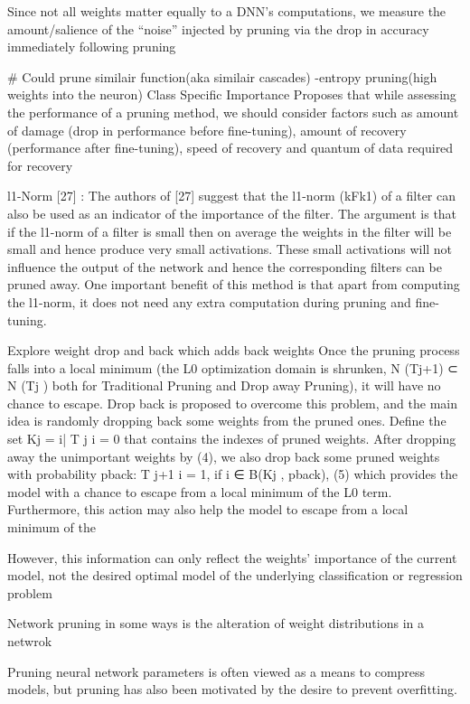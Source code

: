\documentclass{article}
\begin{document}
Since
not all weights matter equally to a DNN’s computations, we measure the amount/salience of the
“noise” injected by pruning via the drop in accuracy immediately following pruning

# Could prune similair function(aka similair cascades)
-entropy pruning(high weights into the neuron)
Class Specific Importance
Proposes that while assessing the performance of
a pruning method, we should consider factors such
as amount of damage (drop in performance before
fine-tuning), amount of recovery (performance after
fine-tuning), speed of recovery and quantum of data
required for recovery

l1-Norm [27] : The authors of [27] suggest that the
l1-norm (kFk1) of a filter can also be used as an
indicator of the importance of the filter. The argument is that if the l1-norm of a filter is small then
on average the weights in the filter will be small
and hence produce very small activations. These
small activations will not influence the output of the
network and hence the corresponding filters can be
pruned away. One important benefit of this method
is that apart from computing the l1-norm, it does
not need any extra computation during pruning and
fine-tuning.

Explore weight drop and back \cite{Jia2020StochasticMP} which adds back weights Once the pruning process falls into a local minimum (the
L0 optimization domain is shrunken, N (Tj+1) ⊂ N (Tj
)
both for Traditional Pruning and Drop away Pruning), it will
have no chance to escape. Drop back is proposed to overcome this problem, and the main idea is randomly dropping
back some weights from the pruned ones. Define the set
Kj = {i| T
j
i = 0} that contains the indexes of pruned
weights. After dropping away the unimportant weights by
(4), we also drop back some pruned weights with probability pback:
T
j+1
i = 1, if i ∈ B(Kj
, pback), (5)
which provides the model with a chance to escape from a local minimum of the L0 term. Furthermore, this action may
also help the model to escape from a local minimum of the


However, this information can only reflect the weights’
importance of the current model, not the desired optimal
model of the underlying classification or regression problem


Network pruning in some ways is the alteration of weight distributions in a netwrok

\cite{Bartoldson2019TheGT} Pruning neural network parameters is often viewed as a means to compress models, but pruning has also been motivated by the desire to prevent overfitting. 
\end{document}
